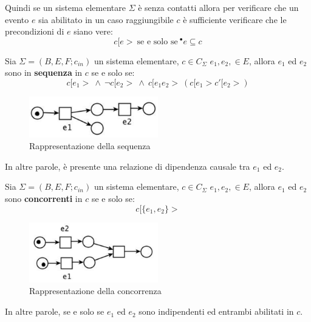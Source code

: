 Quindi se un sistema elementare $\Sigma$ è senza contatti allora per verificare
che un evento $e$ sia abilitato in un caso raggiungibile $c$ è sufficiente
verificare che le precondizioni di $e$ siano vere:
\begin{equation}
    c[e> \ \text{se e solo se} \ ^{\bullet} e \subseteq c
\end{equation}
\begin{definizione}
    Sia $\Sigma = (B, E, F; c_{in})$ un sistema elementare, $c \in C_{\Sigma}$
    $e_1, e_2, \in E$, allora $e_1$ ed $e_2$ sono in \textbf{sequenza} in $c$
    se e solo se:
    \begin{equation}
        c[e_1 > \ \land \ \lnot c[e_2 > \ \land \ c[e_1e_2 > \ (c[e_1 > c'[e_2 >)
    \end{equation}
    \begin{figure}[!ht]
        \centering
        \includegraphics[width=0.5\textwidth]{img/reti/Seq.png}
        \caption{Rappresentazione della sequenza}
    \end{figure}
    In altre parole, è presente una relazione di dipendenza causale tra $e_1$ ed
    $e_2$.
\end{definizione}
\begin{definizione}
    Sia $\Sigma = (B, E, F; c_{in})$ un sistema elementare, $c \in C_{\Sigma}$
    $e_1, e_2, \in E$, allora $e_1$ ed $e_2$ sono \textbf{concorrenti} in $c$
    se e solo se:
    \begin{equation}
        c[\{e_1, e_2\} >
    \end{equation}
    \begin{figure}[!ht]
        \centering
        \includegraphics[width=0.5\textwidth]{img/reti/conc.png}
        \caption{Rappresentazione della concorrenza}
    \end{figure}
    In altre parole, se e solo se $e_1$ ed $e_2$ sono indipendenti ed entrambi
    abilitati in $c$.
\end{definizione}
